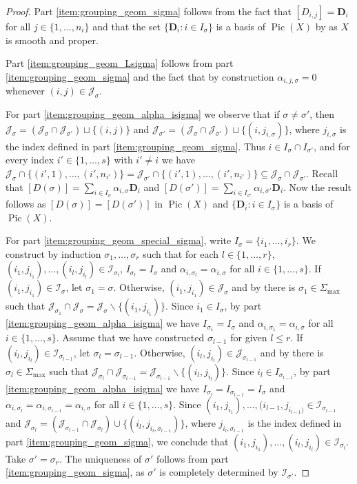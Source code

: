 \documentclass[10pt, a4paper, reqno, english]{amsart}
\newcommand{\ii}[1]{\mathcal{J}_{#1}} %
\newcommand{\ic}[1]{\mathcal{I}_{#1}} %
\newcommand{\divclass}{{\mathbf D}} %
\DeclareMathOperator{\pic}{Pic} %
\theoremstyle{definition}
\numberwithin{theorem}{section}
\numberwithin{equation}{section}
\begin{document}
\begin{proof}
Part \ref{item:grouping_geom_sigma} follows from the fact that $[D_{i,j}]=\divclass_i$ for all $j\in\{1,\dots,n_i\}$ and that the set $\{\divclass_i:i\in I_\sigma\}$ is a basis of $\pic(X)$ by \cite[Theorem 4.2.8]{MR2810322} as $X$ is smooth and proper.

Part \ref{item:grouping_geom_Lsigma} follows from part \ref{item:grouping_geom_sigma} and the fact that by construction $\alpha_{i,j,\sigma}=0$ whenever $(i,j)\in\ii{\sigma}$.

For part \ref{item:grouping_geom_alpha_isigma} we observe that 
if $\sigma\neq\sigma'$, then $\ii{\sigma}=(\ii{\sigma}\cap\ii{\sigma'})\sqcup\{(i,j)\}$ and $\ii{\sigma'}=(\ii{\sigma}\cap\ii{\sigma'})\sqcup\{(i,j_{i,\sigma})\}$, where  $j_{i,\sigma}$ is the index defined in part \ref{item:grouping_geom_sigma}.
Thus $i\in I_\sigma\cap I_{\sigma'}$, and for every index $i'\in\{1,\dots,s\}$ with $i'\neq i$ we have $\ii{\sigma}\cap \{(i',1),\dots,(i',n_{i'})\}=\ii{\sigma'}\cap \{(i',1),\dots,(i',n_{i'})\} \subseteq\ii{\sigma}\cap\ii{\sigma'}$. Recall that $[D(\sigma)]=\sum_{i\in I_\sigma}\alpha_{i,\sigma}\divclass_i$ and $[D(\sigma')]=\sum_{i\in I_{\sigma'}}\alpha_{i,\sigma'}\divclass_i$. Now the result follows as $[D(\sigma)]=[D(\sigma')]$ in $\pic(X)$ and $\{\divclass_i:i\in I_\sigma\}$ is a basis of $\pic(X)$.

For part \ref{item:grouping_geom_special_sigma}, write $I_\sigma=\{i_1,\dots,i_r\}$. 
We construct by induction $\sigma_1,\dots,\sigma_r$ such that for each $l\in\{1,\dots,r\}$, $(i_1,j_{i_1}),\dots,(i_l,j_{i_l})\in\ic{\sigma_l}$, $I_{\sigma_l}=I_\sigma$ and $\alpha_{i,\sigma_l}=\alpha_{i,\sigma}$ for all $i\in\{1,\dots,s\}$. 
If $(i_1,j_{i_1})\in\ic{\sigma}$, let $\sigma_1=\sigma$. 
Otherwise, $(i_1,j_{i_1})\in\ii{\sigma}$ and by \cite[Lemma 8.9]{MR1679841} there is $\sigma_1\in\Sigma_{\max}$ such that $\ii{\sigma_1}\cap\ii{\sigma}=\ii{\sigma}\smallsetminus\{(i_1,j_{i_1})\}$. 
Since $i_1\in I_\sigma$, by part \ref{item:grouping_geom_alpha_isigma} we have $I_{\sigma_1}=I_\sigma$ and $\alpha_{i,\sigma_1}=\alpha_{i,\sigma}$ for all $i\in\{1,\dots,s\}$. 
Assume that we have constructed $\sigma_{l-1}$ for given $l\leq r$. If $(i_l,j_{i_l})\in\ic{\sigma_{l-1}}$, let $\sigma_l=\sigma_{l-1}$. 
Otherwise, $(i_l,j_{i_l})\in\ii{\sigma_{l-1}}$ and by \cite[Lemma 8.9]{MR1679841} there is $\sigma_l\in\Sigma_{\max}$ such that $\ii{\sigma_l}\cap\ii{\sigma_{l-1}}=\ii{\sigma_{l-1}}\smallsetminus\{(i_l,j_{i_l})\}$. 
Since $i_l\in I_{\sigma_{l-1}}$, by part \ref{item:grouping_geom_alpha_isigma} we have $I_{\sigma_l}=I_{\sigma_{l-1}}=I_\sigma$ and $\alpha_{i,\sigma_l}=\alpha_{i,\sigma_{l-1}}=\alpha_{i,\sigma}$ for all $i\in\{1,\dots,s\}$. 
Since $(i_1,j_{i_1}),\dots,(i_{l-1},j_{i_{l-1})}\in\ic{\sigma_{l-1}}$ and $\ii{\sigma_l}=(\ii{\sigma_{l-1}}\cap\ii{\sigma_l})\cup\{(i_l,j_{i_l,\sigma_{l-1}})\}$, where $j_{i_l,\sigma_{l-1}}$ is the index defined in part \ref{item:grouping_geom_sigma}, we conclude that $(i_1,j_{i_1}),\dots,(i_l,j_{i_l})\in\ic{\sigma_l}$. Take $\sigma'=\sigma_r$.
The uniqueness of $\sigma'$ follows from part \ref{item:grouping_geom_sigma}, as $\sigma'$ is completely determined by $\ic{\sigma'}$.


\end{proof}
\end{document}

